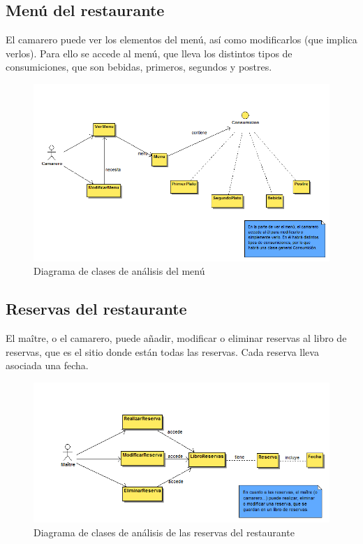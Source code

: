 \documentclass[spanish,a4paper,11pt, twoside]{report}	%
\begin{document}
		\subsection{Menú del restaurante}
		El camarero puede ver los elementos del menú, así como modificarlos (que implica verlos). Para ello se accede al menú, que lleva los distintos tipos de consumiciones, que son bebidas, primeros, segundos y postres.
		\begin{figure}[!h]
		\centering
		\includegraphics[scale=0.5]{DCAmenu.png}
		\caption{Diagrama de clases de análisis del menú}
		\end{figure}

		\subsection{Reservas del restaurante}
		El maître, o el camarero, puede añadir, modificar o eliminar reservas al libro de reservas, que es el sitio donde están todas las reservas. Cada reserva lleva asociada una fecha.
		\begin{figure}[!h]
		\centering
		\includegraphics[scale=0.5]{DCAresevas.png}
		\caption{Diagrama de clases de análisis de las reservas del restaurante}
		\end{figure}
\end{document}
